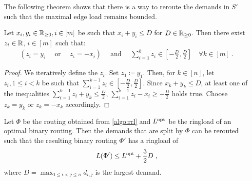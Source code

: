 The following theorem shows that there is a way to reroute the demands in $S'$ such that the maximal edge load remains bounded.
\begin{lemma}
	\label{lemma:reroute-demands}
	Let $x_i, y_i \in \mathbb{R}_{\geq 0}, i \in [m]$ be such that $x_i + y_i \leq D$ for $D \in \mathbb{R}_{\geq 0}$.
	Then there exist $z_i \in \mathbb{R}$, $i \in [m]$ such that:
	\begin{align}
		(z_i = y_i \quad \text{ or } \quad z_i = -x_i) 
		\quad \text{ and } \quad \sum_{i=1}^k z_i \in \left[-\frac{D}{2}, \frac{D}{2}\right] \quad \forall k \in [m] \ .
	\end{align}
\end{lemma}
\begin{proof}
	We iteratively define the $z_i$.
	Set $z_1 \coloneqq y_1$.
	Then, for $k \in [n]$, let $z_i, 1 \leq i < k$ be such that $\sum_{i=1}^{k-1} z_i \in \left[-\frac{D}{2}, \frac{D}{2}\right]$.
	Since $x_k + y_k \leq D$, at least one of the inequalities $\sum_{i=1}^{k-1} z_i + y_k \leq \frac{D}{2}$, $\sum_{i=1}^{k-1} z_i - x_i \geq -\frac{D}{2}$ holds true.
	Choose $z_k = y_k$ or $z_k = -x_k$ accordingly.	
\end{proof}
\begin{theorem}
	\label{theo:ring-loading-algorithm}
	Let $\Phi$ be the routing obtained from \cref{algo:rrl} and $L^{\mathrm{opt}}$ be the ringload of an optimal binary routing.
	Then the demands that are split by $\Phi$ can be rerouted such that the resulting binary routing $\Phi'$ has a ringload of
	\begin{equation}
		L(\Phi') \leq L^{\mathrm{opt}} + \frac{3}{2}D \ ,
	\end{equation}
	where $D = \max_{1 \leq i < j \leq n} d_{i, j}$ is the largest demand.
\end{theorem}
